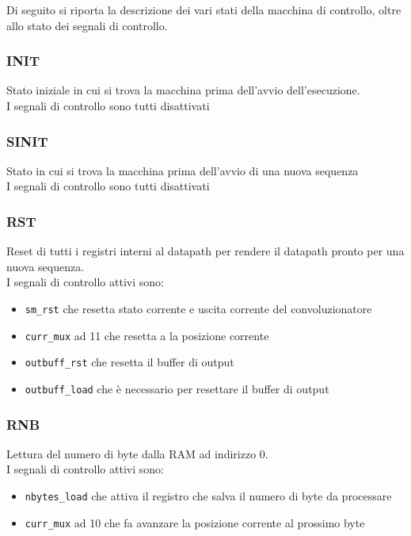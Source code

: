 \documentclass[12pt, a4paper]{article}
\begin{document}
Di seguito si riporta la descrizione dei vari stati della macchina di controllo, oltre allo stato dei segnali di controllo.

\subsubsection{INIT}
Stato iniziale in cui si trova la macchina prima dell'avvio dell'esecuzione.\\
I segnali di controllo sono tutti disattivati

\subsubsection{SINIT}
Stato in cui si trova la macchina prima dell'avvio di una nuova sequenza\\
I segnali di controllo sono tutti disattivati

\pagebreak

\subsubsection{RST}
Reset di tutti i registri interni al datapath per rendere il datapath pronto per
una nuova sequenza.\\
I segnali di controllo attivi sono:
\begin{itemize}
    \item \texttt{sm\_rst} che resetta stato corrente e uscita corrente del convoluzionatore
    \item \texttt{curr\_mux} ad 11 che resetta a la posizione corrente
    \item \texttt{outbuff\_rst} che resetta il buffer di output
    \item \texttt{outbuff\_load} che è necessario per resettare il buffer di output
\end{itemize}

\subsubsection{RNB}
Lettura del numero di byte dalla RAM ad indirizzo 0.\\
I segnali di controllo attivi sono:
\begin{itemize}
    \item \texttt{nbytes\_load} che attiva il registro che salva il numero di byte da processare
    \item \texttt{curr\_mux} ad 10 che fa avanzare la posizione corrente al prossimo byte
\end{itemize}
\end{document}
